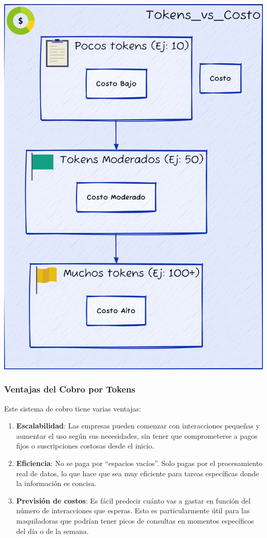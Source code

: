 \documentclass[
  10pt,
  letterpaper,
]{book}
\providecommand{\tightlist}{%
  \setlength{\itemsep}{0pt}\setlength{\parskip}{0pt}}\usepackage{longtable,booktabs,array}
\begin{document}
\includegraphics[width=1\textwidth,height=\textheight]{index_files/mediabag/diagram-4.pdf}

\subsubsection{\texorpdfstring{\textbf{Ventajas del Cobro por
Tokens}}{Ventajas del Cobro por Tokens}}\label{ventajas-del-cobro-por-tokens}

Este sistema de cobro tiene varias ventajas:

\begin{enumerate}
\def\labelenumi{\arabic{enumi}.}
\tightlist
\item
  \textbf{Escalabilidad}: Las empresas pueden comenzar con interacciones
  pequeñas y aumentar el uso según sus necesidades, sin tener que
  comprometerse a pagos fijos o suscripciones costosas desde el inicio.
\item
  \textbf{Eficiencia}: No se paga por ``espacios vacíos''. Solo pagas
  por el procesamiento real de datos, lo que hace que sea muy eficiente
  para tareas específicas donde la información es concisa.
\item
  \textbf{Previsión de costos}: Es fácil predecir cuánto vas a gastar en
  función del número de interacciones que esperas. Esto es
  particularmente útil para las maquiladoras que podrían tener picos de
  consultas en momentos específicos del día o de la semana.
\end{enumerate}
\end{document}
